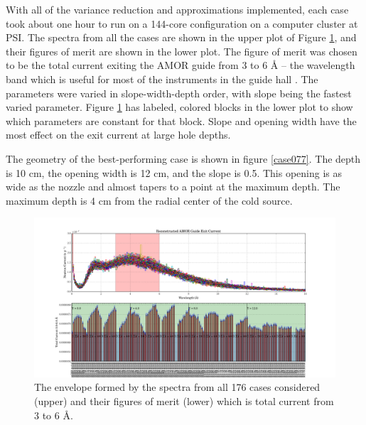 \documentclass[a4paper]{jpconf}
\begin{document}
With all of the variance reduction and approximations implemented, each case took about one hour to run on a 144-core configuration on a computer cluster at PSI.  The spectra from all the cases are shown in the upper plot of Figure \ref{parametric_REH}, and their figures of merit are shown in the lower plot.  The figure of merit was chosen to be the total current exiting the AMOR guide from 3 to 6 \AA{} -- the wavelength band which is useful for most of the instruments in the guide hall \cite{intruments_wavelength}.  The parameters were varied in slope-width-depth order, with slope being the fastest varied parameter. Figure \ref{parametric_REH} has labeled, colored blocks in the lower plot to show which parameters are constant for that block.  Slope and opening width have the most effect on the exit current at large hole depths.

The geometry of the best-performing case is shown in figure \ref{case077}.  The depth is 10 cm, the opening width is 12 cm, and the slope is 0.5.  This opening is as wide as the nozzle and almost tapers to a point at the maximum depth.  The maximum depth is 4 cm from the radial center of the cold source.  

\begin{figure}
\begin{center}
\includegraphics[scale=0.38,trim={1cm 2.35cm 1cm 0cm},clip]{graphics/parametric_REH.pdf}
\end{center}
\caption{\label{parametric_REH}The envelope formed by the spectra from all 176 cases considered (upper) and their figures of merit (lower) which is total current from 3 to 6 \AA{}.}
\end{figure}
\end{document}
